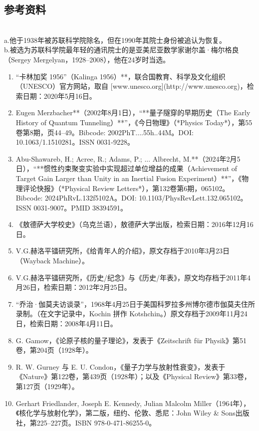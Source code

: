 \subsection{参考资料}\\
a.他于1938年被苏联科学院除名，但在1990年其院士身份被追认为恢复。\\
b.被选为苏联科学院最年轻的通讯院士的是亚美尼亚数学家谢尔盖·梅尔格良（Sergey Mergelyan，1928–2008），他在24岁时当选。
\begin{enumerate}
\item “卡林加奖 1956”（Kalinga 1956）**，联合国教育、科学及文化组织（UNESCO）官方网站，取自 [www.unesco.org](http://www.unesco.org)，检索日期：2020年5月16日。
\item Eugen Merzbacher**（2002年8月1日），“**量子隧穿的早期历史（The Early History of Quantum Tunneling）**”，《今日物理》（*Physics Today*），第55卷第8期，页44–49。Bibcode: 2002PhT....55h..44M。DOI: 10.1063/1.1510281。ISSN 0031-9228。
\item Abu-Shawareb, H.; Acree, R.; Adams, P.; ... Albrecht, M.**（2024年2月5日），“**惯性约束聚变实验中实现超过单位增益的成果（Achievement of Target Gain Larger than Unity in an Inertial Fusion Experiment）**”，《物理评论快报》（*Physical Review Letters*），第132卷第6期，065102。Bibcode: 2024PhRvL.132f5102A。DOI: 10.1103/PhysRevLett.132.065102。ISSN 0031-9007。PMID 38394591。
\item 《敖德萨大学校史》（乌克兰语），敖德萨大学出版，检索日期：2016年12月16日。
\item V.G.赫洛平镭研究所，《给青年人的介绍》，原文存档于2010年3月23日（Wayback Machine）。
\item V.G.赫洛平镭研究所，《历史/纪念》与《历史/年表》，原文均存档于2011年4月26日，检索日期：2012年2月25日。
\item “乔治·伽莫夫访谈录”，1968年4月25日于美国科罗拉多州博尔德市伽莫夫住所录制。（在文字记录中，Kochin 拼作 Kotshchin。）原文存档于2009年11月24日，检索日期：2008年4月11日。
\item G. Gamow，《论原子核的量子理论》，发表于《Zeitschrift für Physik》第51卷，第204页（1928年）。
\item R. W. Gurney 与 E. U. Condon，《量子力学与放射性衰变》，发表于《Nature》第122卷，第439页（1928年）；以及《Physical Review》第33卷，第127页（1929年）。
\item Gerhart Friedlander, Joseph E. Kennedy, Julian Malcolm Miller（1964年），《核化学与放射化学》，第二版，纽约、伦敦、悉尼：John Wiley & Sons出版社，第225–227页。ISBN 978-0-471-86255-0。
\end{enumerate}